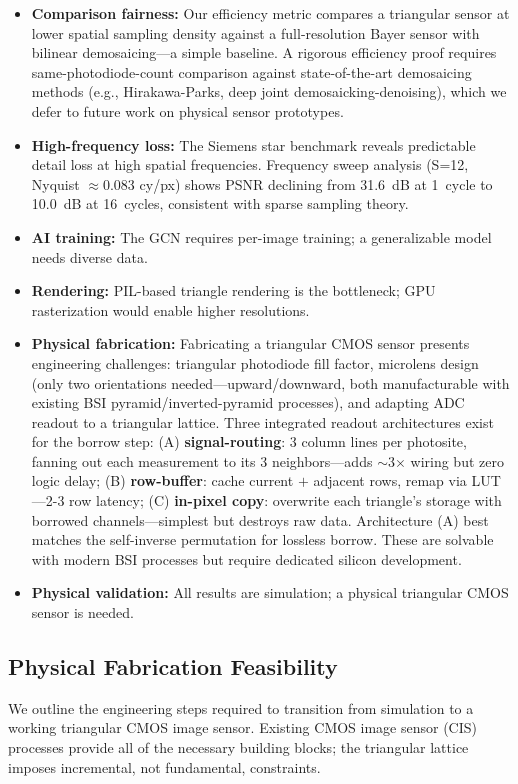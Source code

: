 \documentclass[10pt,twocolumn,letterpaper]{article}
\begin{document}
\begin{itemize}[nosep]
\item \textbf{Comparison fairness:} Our efficiency metric compares a triangular sensor at lower spatial sampling density against a full-resolution Bayer sensor with bilinear demosaicing---a simple baseline. A rigorous efficiency proof requires same-photodiode-count comparison against state-of-the-art demosaicing methods (e.g., Hirakawa-Parks, deep joint demosaicking-denoising), which we defer to future work on physical sensor prototypes.
\item \textbf{High-frequency loss:} The Siemens star benchmark reveals predictable detail loss at high spatial frequencies. Frequency sweep analysis (S=12, Nyquist $\approx$0.083 cy/px) shows PSNR declining from 31.6~dB at 1~cycle to 10.0~dB at 16~cycles, consistent with sparse sampling theory.
\item \textbf{AI training:} The GCN requires per-image training; a generalizable model needs diverse data.
\item \textbf{Rendering:} PIL-based triangle rendering is the bottleneck; GPU rasterization would enable higher resolutions.
\item \textbf{Physical fabrication:} Fabricating a triangular CMOS sensor presents engineering challenges: triangular photodiode fill factor, microlens design (only two orientations needed---upward/downward, both manufacturable with existing BSI pyramid/inverted-pyramid processes), and adapting ADC readout to a triangular lattice. Three integrated readout architectures exist for the borrow step: (A) \textbf{signal-routing}: 3 column lines per photosite, fanning out each measurement to its 3 neighbors---adds $\sim$3$\times$ wiring but zero logic delay; (B) \textbf{row-buffer}: cache current $+$ adjacent rows, remap via LUT---2-3 row latency; (C) \textbf{in-pixel copy}: overwrite each triangle's storage with borrowed channels---simplest but destroys raw data. Architecture (A) best matches the self-inverse permutation for lossless borrow. These are solvable with modern BSI processes but require dedicated silicon development.
\item \textbf{Physical validation:} All results are simulation; a physical triangular CMOS sensor is needed.
\end{itemize}

\subsection{Physical Fabrication Feasibility}\label{sec:fab}
We outline the engineering steps required to transition from simulation to a working triangular CMOS image sensor. Existing CMOS image sensor (CIS) processes provide all of the necessary building blocks; the triangular lattice imposes incremental, not fundamental, constraints.
\end{document}
